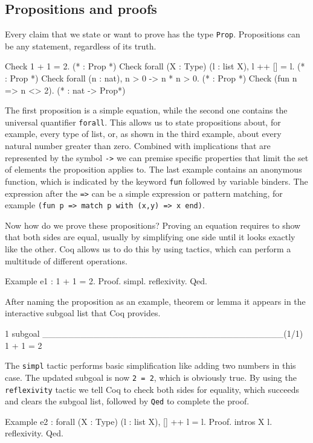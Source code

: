 \documentclass[paper = a4, fleqn, twoside]{scrreprt}
\newcommand{\coqinline}[1]{\texttt{#1}}
\begin{document}
\subsection{Propositions and proofs}
Every claim that we state or want to prove has the type \coqinline{Prop}. Propositions can be any statement, regardless of its truth.
\begin{coqcode}
Check 1 + 1 = 2. (* : Prop *)
Check forall (X : Type) (l : list X), l ++ [] = l. (* : Prop *)
Check forall (n : nat), n > 0 -> n * n > 0. (* : Prop *)
Check (fun n => n <> 2). (* : nat -> Prop*)
\end{coqcode}
The first proposition is a simple equation, while the second one contains the universal quantifier \coqinline{forall}. This allows us to state propositions about, for example, every type of list, or, as shown in the third example, about every natural number greater than zero. Combined with implications that are represented by the symbol \coqinline{->} we can premise specific properties that limit the set of elements the proposition applies to. The last example contains an anonymous function, which is indicated by the keyword \coqinline{fun} followed by variable binders. The expression after the \coqinline{=>} can be a simple expression or pattern matching, for example \coqinline{(fun p => match p with (x,y) => x end)}.
\par
Now how do we prove these propositions? Proving an equation requires to show that both sides are equal, usually by simplifying one side until it looks exactly like the other. Coq allows us to do this by using tactics, which can perform a multitude of different operations.
\begin{coqcode}
Example e1 : 1 + 1 = 2.
Proof. simpl. reflexivity. Qed. 
\end{coqcode} 
After naming the proposition as an example, theorem or lemma it appears in the interactive subgoal list that Coq provides.
\begin{coqcode}
1 subgoal
______________________________________(1/1)
1 + 1 = 2
\end{coqcode}
The \coqinline{simpl} tactic performs basic simplification like adding two numbers in this case. The updated subgoal is now \coqinline{2 = 2}, which is obviously true. By using the \coqinline{reflexivity} tactic we tell Coq to check both sides for equality, which succeeds and clears the subgoal list, followed by \coqinline{Qed} to complete the proof.
\begin{coqcode}
Example e2 : forall (X : Type) (l : list X), [] ++ l = l.
Proof. intros X l. reflexivity. Qed.
\end{coqcode}
\end{document}
